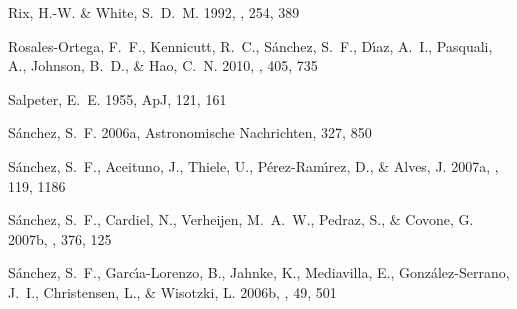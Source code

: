 \begin{thebibliography}
{Rix}, H.-W. \& {White}, S.~D.~M. 1992, \mnras, 254, 389


{Rosales-Ortega}, F.~F., {Kennicutt}, R.~C., {S{\'a}nchez}, S.~F.,
  {D{\'{\i}}az}, A.~I., {Pasquali}, A., {Johnson}, B.~D., \& {Hao}, C.~N. 2010,
  \mnras, 405, 735


Salpeter, E.~E. 1955, ApJ, 121, 161
 \href{http://adsabs.harvard.edu/cgi-bin/nph-data_query?bibcode=1955ApJ...121.%
.161S&link_type=ABSTRACT}{\urllinklabel}

{S{\'a}nchez}, S.~F. 2006a, Astronomische Nachrichten, 327, 850


{S{\'a}nchez}, S.~F., {Aceituno}, J., {Thiele}, U., {P{\'e}rez-Ram{\'{\i}}rez},
  D., \& {Alves}, J. 2007a, \pasp, 119, 1186


{S{\'a}nchez}, S.~F., {Cardiel}, N., {Verheijen}, M.~A.~W., {Pedraz}, S., \&
  {Covone}, G. 2007b, \mnras, 376, 125


{S{\'a}nchez}, S.~F., {Garc{\'{\i}}a-Lorenzo}, B., {Jahnke}, K., {Mediavilla},
  E., {Gonz{\'a}lez-Serrano}, J.~I., {Christensen}, L., \& {Wisotzki}, L.
  2006b, \nar, 49, 501



\end{thebibliography}
